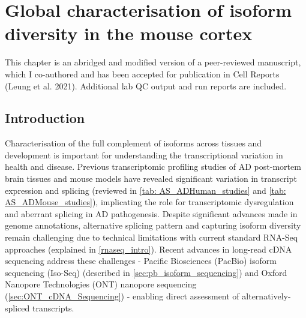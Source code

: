 \chapter{Global characterisation of isoform diversity in the mouse cortex}
\label{ch: whole_transcriptome}


This chapter is an abridged and modified version of a peer-reviewed manuscript, which I co-authored and has been accepted for publication in Cell Reports (Leung et al. 2021)\cite{KayLeung2021}. Additional lab QC output and run reports are included. 

\section{Introduction}
Characterisation of the full complement of isoforms across tissues and development is important for understanding the transcriptional variation in health and disease. Previous transcriptomic profiling studies of AD post-mortem brain tissues and mouse models have revealed significant variation in transcript expression and splicing (reviewed in \cref{tab: AS_ADHuman_studies} and \cref{tab: AS_ADMouse_studies}), implicating the role for transcriptomic dysregulation and aberrant splicing in AD pathogenesis\cite{Raj2018}. Despite significant advances made in genome annotations, alternative splicing pattern and capturing isoform diversity remain challenging due to technical limitations with current standard RNA-Seq approaches (explained in \cref{rnaseq_intro}). Recent advances in long-read cDNA sequencing address these challenges - Pacific Biosciences (PacBio) isoform sequencing (Iso-Seq) (described in \cref{sec:pb_isoform_sequencing}) and Oxford Nanopore Technologies (ONT) nanopore sequencing (\cref{sec:ONT_cDNA_Sequencing}) - enabling direct assessment of alternatively-spliced transcripts\cite{Amarasinghe2020}.

